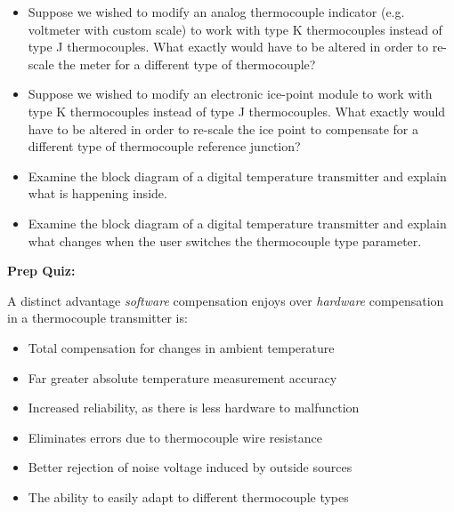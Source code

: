 \begin{itemize}
\item{} Suppose we wished to modify an analog thermocouple indicator (e.g. voltmeter with custom scale) to work with type K thermocouples instead of type J thermocouples.  What exactly would have to be altered in order to re-scale the meter for a different type of thermocouple?
\item{} Suppose we wished to modify an electronic ice-point module to work with type K thermocouples instead of type J thermocouples.  What exactly would have to be altered in order to re-scale the ice point to compensate for a different type of thermocouple reference junction?
\item{} Examine the block diagram of a digital temperature transmitter and explain what is happening inside.
\item{} Examine the block diagram of a digital temperature transmitter and explain what changes when the user switches the thermocouple type parameter.
\end{itemize}








\vfil \eject

\noindent
{\bf Prep Quiz:}

A distinct advantage {\it software} compensation enjoys over {\it hardware} compensation in a thermocouple transmitter is:

\begin{itemize}
\item{} Total compensation for changes in ambient temperature
\vskip 5pt 
\item{} Far greater absolute temperature measurement accuracy 
\vskip 5pt 
\item{} Increased reliability, as there is less hardware to malfunction
\vskip 5pt 
\item{} Eliminates errors due to thermocouple wire resistance
\vskip 5pt 
\item{} Better rejection of noise voltage induced by outside sources
\vskip 5pt 
\item{} The ability to easily adapt to different thermocouple types
\end{itemize}







